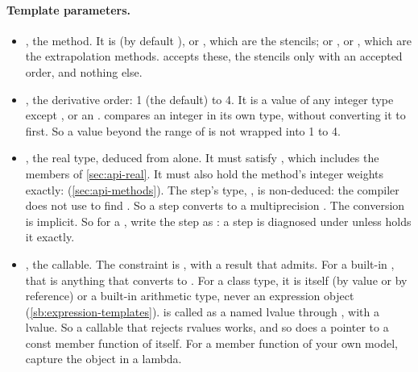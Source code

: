 \paragraph{Template parameters.}
\begingroup\raggedright
\begin{itemize}
  \item {}, the method. It is  (by default ),  or
    , which are the stencils; or ,  or ,
    which are the extrapolation methods.  accepts these, the stencils only with an accepted
    order, and nothing else.
  \item {}, the derivative order: 1 (the default) to 4. It is a value of any integer type except ,
    or an .  compares an integer in its own type, without converting it to
     first. So a value beyond the range of  is not wrapped into 1 to 4.
  \item {}, the real type, deduced from  alone. It must satisfy , which includes the
     members of \cref{sec:api-real}. It must also hold the method's integer weights exactly:
     (\cref{sec:api-methods}). The step's type, ,
    is non-deduced: the compiler does not use  to find . So a  step converts to a
    multiprecision . The conversion is implicit. So for a  , write the step as
    : a  step is diagnosed under  unless  holds it exactly.
  \item {}, the callable. The constraint  is
    , with a result that  admits. For a
    built-in , that is anything that converts to . For a class type, it is  itself (by value
    or by reference) or a built-in arithmetic type, never an expression object (\cref{sb:expression-templates}).
     is called as a named lvalue through , with a  lvalue. So a callable that rejects rvalues
    works, and so does a pointer to a const member function of  itself. For a member function of your own
    model, capture the object in a lambda.
\end{itemize}
\endgroup


